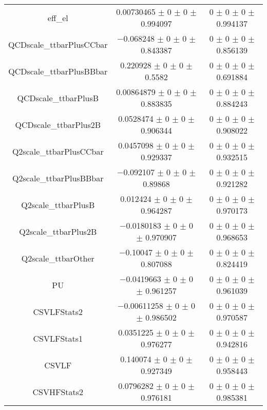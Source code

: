 \begin{table}
\begin{tabular}{ccc}
eff\_el & \num{0.00730465} $\pm$ \num{0} $\pm$ \num{0} $\pm$ \num{0.994097} & \num{0} $\pm$ \num{0} $\pm$ \num{0} $\pm$ \num{0.994137}\\
QCDscale\_ttbarPlusCCbar & \num{-0.068248} $\pm$ \num{0} $\pm$ \num{0} $\pm$ \num{0.843387} & \num{0} $\pm$ \num{0} $\pm$ \num{0} $\pm$ \num{0.856139}\\
QCDscale\_ttbarPlusBBbar & \num{0.220928} $\pm$ \num{0} $\pm$ \num{0} $\pm$ \num{0.5582} & \num{0} $\pm$ \num{0} $\pm$ \num{0} $\pm$ \num{0.691884}\\
QCDscale\_ttbarPlusB & \num{0.00864879} $\pm$ \num{0} $\pm$ \num{0} $\pm$ \num{0.883835} & \num{0} $\pm$ \num{0} $\pm$ \num{0} $\pm$ \num{0.884243}\\
QCDscale\_ttbarPlus2B & \num{0.0528474} $\pm$ \num{0} $\pm$ \num{0} $\pm$ \num{0.906344} & \num{0} $\pm$ \num{0} $\pm$ \num{0} $\pm$ \num{0.908022}\\
Q2scale\_ttbarPlusCCbar & \num{0.0457098} $\pm$ \num{0} $\pm$ \num{0} $\pm$ \num{0.929337} & \num{0} $\pm$ \num{0} $\pm$ \num{0} $\pm$ \num{0.932515}\\
Q2scale\_ttbarPlusBBbar & \num{-0.092107} $\pm$ \num{0} $\pm$ \num{0} $\pm$ \num{0.89868} & \num{0} $\pm$ \num{0} $\pm$ \num{0} $\pm$ \num{0.921282}\\
Q2scale\_ttbarPlusB & \num{0.012424} $\pm$ \num{0} $\pm$ \num{0} $\pm$ \num{0.964287} & \num{0} $\pm$ \num{0} $\pm$ \num{0} $\pm$ \num{0.970173}\\
Q2scale\_ttbarPlus2B & \num{-0.0180183} $\pm$ \num{0} $\pm$ \num{0} $\pm$ \num{0.970907} & \num{0} $\pm$ \num{0} $\pm$ \num{0} $\pm$ \num{0.968653}\\
Q2scale\_ttbarOther & \num{-0.10047} $\pm$ \num{0} $\pm$ \num{0} $\pm$ \num{0.807088} & \num{0} $\pm$ \num{0} $\pm$ \num{0} $\pm$ \num{0.824419}\\
PU & \num{-0.0419663} $\pm$ \num{0} $\pm$ \num{0} $\pm$ \num{0.961257} & \num{0} $\pm$ \num{0} $\pm$ \num{0} $\pm$ \num{0.961039}\\
CSVLFStats2 & \num{-0.00611258} $\pm$ \num{0} $\pm$ \num{0} $\pm$ \num{0.986502} & \num{0} $\pm$ \num{0} $\pm$ \num{0} $\pm$ \num{0.970587}\\
CSVLFStats1 & \num{0.0351225} $\pm$ \num{0} $\pm$ \num{0} $\pm$ \num{0.976277} & \num{0} $\pm$ \num{0} $\pm$ \num{0} $\pm$ \num{0.942816}\\
CSVLF & \num{0.140074} $\pm$ \num{0} $\pm$ \num{0} $\pm$ \num{0.927349} & \num{0} $\pm$ \num{0} $\pm$ \num{0} $\pm$ \num{0.958443}\\
CSVHFStats2 & \num{0.0796282} $\pm$ \num{0} $\pm$ \num{0} $\pm$ \num{0.976181} & \num{0} $\pm$ \num{0} $\pm$ \num{0} $\pm$ \num{0.985381}\\

\end{tabular}
\end{table}
